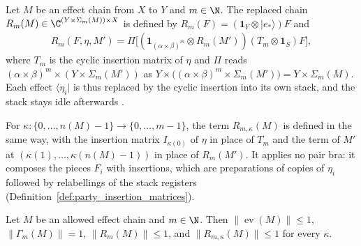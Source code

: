 \begin{definition}
    \label{def:party_effect_chain_replacement}
    \leanok
    Let $M$ be an effect chain from $X$ to $Y$ and $m\in\N$. The replaced
    chain $R_m(M)\in\C^{(Y\times\Sigma_m(M))\times X}$ is defined by
    $R_m(F)=(\mathbf 1_Y\otimes|e_*\rangle)F$ and
    \begin{align}
        R_m(F,\eta,M')=\Pi\bigl[(\mathbf 1_{(\alpha\times\beta)^m}\otimes
                              R_m(M'))(T_m\otimes\mathbf 1_S)F\bigr],
        \label{eq:party_replace}
    \end{align}
    where $T_m$ is the cyclic insertion matrix of $\eta$ and $\Pi$ reads
    $(\alpha\times\beta)^m\times(Y\times\Sigma_m(M'))$ as
    $Y\times\bigl((\alpha\times\beta)^m\times\Sigma_m(M')\bigr)
        =Y\times\Sigma_m(M)$. Each effect $\langle\eta_i|$ is thus replaced
    by the cyclic insertion into its own stack, and the stack stays idle
    afterwards \cite[proof of Lemma~5.1]{OpenAI2026PolynomialPEPS}.

    For $\kappa:\{0,\dots,n(M)-1\}\to\{0,\dots,m-1\}$, the term
    $R_{m,\kappa}(M)$ is defined in the same way, with the insertion matrix
    $I_{\kappa(0)}$ of $\eta$ in place of $T_m$ and the term of $M'$ at
    $(\kappa(1),\dots,\kappa(n(M)-1))$ in place of $R_m(M')$. It applies no
    pair bra: it composes the pieces $F_i$ with insertions, which are
    preparations of copies of $\eta_i$ followed by relabellings of the
    stack registers (Definition~\ref{def:party_insertion_matrices}).
\end{definition}

\begin{theorem}
    \label{thm:party_effect_chain_contraction}
    \leanok
    Let $M$ be an allowed effect chain and $m\in\N$. Then
    $\lVert\operatorname{ev}(M)\rVert\le1$,
    $\lVert\Gamma_m(M)\rVert=1$, $\lVert R_m(M)\rVert\le1$, and
    $\lVert R_{m,\kappa}(M)\rVert\le1$ for every $\kappa$.
\end{theorem}

